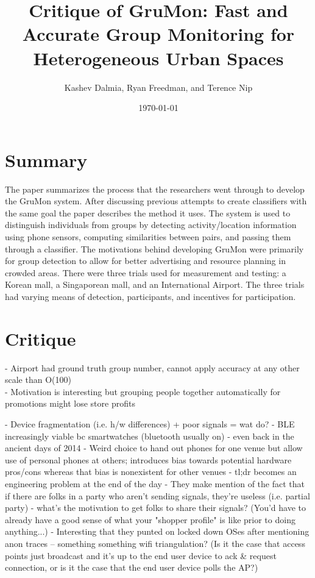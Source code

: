\documentclass[12pt]{amsart}
\title{Critique of GruMon: Fast and Accurate Group Monitoring for Heterogeneous Urban Spaces}
\author[]{Kashev Dalmia, Ryan Freedman, and Terence Nip}
\affil[]{University of Illinois at Urbana-Champaign}
\date{\today}
\begin{document}
\maketitle

\section{\bf Summary}
The paper summarizes the process that the researchers went through to develop the GruMon system. After discussing previous attempts to create classifiers with the same goal the paper describes the method it uses. The system is used to distinguish individuals from groups by detecting activity/location information using phone sensors, computing similarities between pairs, and passing them through a classifier. The motivations behind developing GruMon were primarily for group detection to allow for better advertising and resource planning in crowded areas. There were three trials used for measurement and testing: a Korean mall, a Singaporean mall, and an International Airport. The three trials had varying means of detection, participants, and incentives for participation.

\section{\bf Critique}
\begin{center}
- Airport had ground truth group number, cannot apply accuracy at any other scale than O(100) \\
- Motivation is interesting but grouping people together automatically for promotions might lose store profits

- Device fragmentation (i.e. h/w differences) + poor signals = wat do?
- BLE increasingly viable bc smartwatches (bluetooth usually on) - even back in the ancient days of 2014
- Weird choice to hand out phones for one venue but allow use of personal phones at others; introduces bias towards potential hardware pros/cons whereas that bias is nonexistent for other venues
- tl;dr becomes an engineering problem at the end of the day
- They make mention of the fact that if there are folks in a party who aren't sending signals, they're useless (i.e. partial party) - what's the motivation to get folks to share their signals? (You'd have to already have a good sense of what your "shopper profile" is like prior to doing anything...)
- Interesting that they punted on locked down OSes after mentioning anon traces -- something something wifi triangulation? (Is it the case that access points just broadcast and it's up to the end user device to ack & request connection, or is it the case that the end user device polls the AP?)
\end{center}
\end{document}
